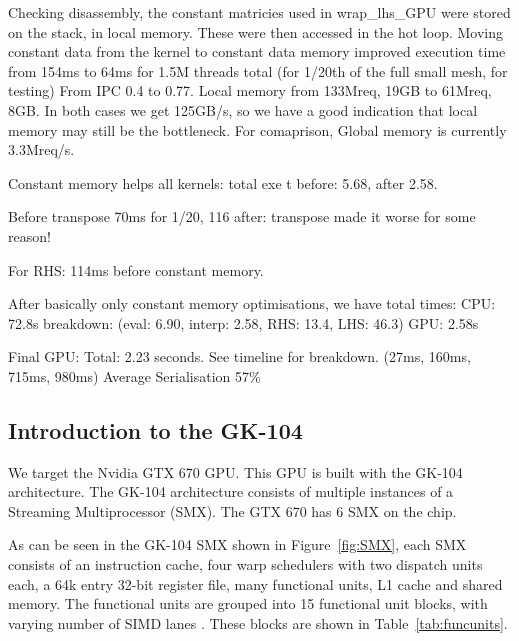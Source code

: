 \documentclass[11pt, oneside, a4paper]{article}
\begin{document}
Checking disassembly, the constant matricies used in wrap\_lhs\_GPU were stored on the stack, in local memory. These were then accessed in the hot loop.
Moving constant data from the kernel to constant data memory improved execution time from 154ms to 64ms for 1.5M threads total (for 1/20th of the full small mesh, for testing)
From IPC 0.4 to 0.77.
Local memory from 133Mreq, 19GB to 61Mreq, 8GB.
In both cases we get 125GB/s, so we have a good indication that local memory may still be the bottleneck.
For comaprison, Global memory is currently 3.3Mreq/s.

Constant memory helps all kernels: total exe t before: 5.68, after 2.58.

Before transpose 70ms for 1/20, 116 after: transpose made it worse for some reason!

For RHS: 114ms before constant memory.

After basically only constant memory optimisations, we have total times:
CPU: 72.8s breakdown: (eval: 6.90, interp: 2.58, RHS: 13.4, LHS: 46.3)
GPU: 2.58s


Final GPU:
Total: 2.23 seconds. See timeline for breakdown. (27ms, 160ms, 715ms, 980ms)
Average Serialisation 57\%







\subsection{Introduction to the GK-104} %
\label{sub:introduction_to_the_gk_104}

We target the Nvidia GTX 670 GPU. This GPU is built with the GK-104 architecture.
The GK-104 architecture consists of multiple instances of a Streaming Multiprocessor (SMX).
The GTX 670 has 6 SMX on the chip. 

As can be seen in the GK-104 SMX shown in Figure~\ref{fig:SMX}, each SMX consists of an instruction cache, four warp schedulers with two dispatch units each, a 64k entry 32-bit register file, many functional units, L1 cache and shared memory.
The functional units are grouped into 15 functional unit blocks, with varying number of SIMD lanes \cite{Anand}. These blocks are shown in Table~\ref{tab:funcunits}.
\end{document}
